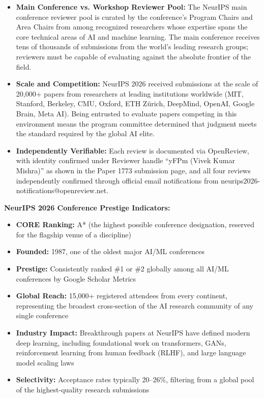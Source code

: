 \begin{itemize}
    \item \textbf{Main Conference vs. Workshop Reviewer Pool:} The NeurIPS main conference reviewer pool is curated by the conference's Program Chairs and Area Chairs from among recognized researchers whose expertise spans the core technical areas of AI and machine learning. The main conference receives tens of thousands of submissions from the world's leading research groups; reviewers must be capable of evaluating against the absolute frontier of the field.
    \item \textbf{Scale and Competition:} NeurIPS 2026 received submissions at the scale of 20,000+ papers from researchers at leading institutions worldwide (MIT, Stanford, Berkeley, CMU, Oxford, ETH Zürich, DeepMind, OpenAI, Google Brain, Meta AI). Being entrusted to evaluate papers competing in this environment means the program committee determined that \drs judgment meets the standard required by the global AI elite.
    \item \textbf{Independently Verifiable:} Each review is documented via OpenReview, with \drs identity confirmed under Reviewer handle ``yFPm (Vivek Kumar Mishra)'' as shown in the Paper 1773 submission page, and all four reviews independently confirmed through official email notifications from neurips2026-notifications@openreview.net.
\end{itemize}

\textbf{NeurIPS 2026 Conference Prestige Indicators:}
\begin{itemize}
    \item \textbf{CORE Ranking:} A* (the highest possible conference designation, reserved for the flagship venue of a discipline)
    \item \textbf{Founded:} 1987, one of the oldest major AI/ML conferences
    \item \textbf{Prestige:} Consistently ranked \#1 or \#2 globally among all AI/ML conferences by Google Scholar Metrics
    \item \textbf{Global Reach:} 15,000+ registered attendees from every continent, representing the broadest cross-section of the AI research community of any single conference
    \item \textbf{Industry Impact:} Breakthrough papers at NeurIPS have defined modern deep learning, including foundational work on transformers, GANs, reinforcement learning from human feedback (RLHF), and large language model scaling laws
    \item \textbf{Selectivity:} Acceptance rates typically 20--26\%, filtering from a global pool of the highest-quality research submissions
\end{itemize}

